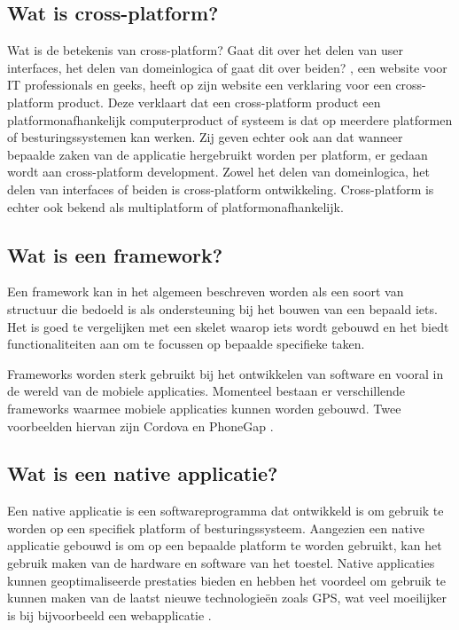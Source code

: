  \subsection{Wat is cross-platform?}
 Wat is de betekenis van cross-platform? Gaat dit over het delen van user interfaces, het delen van domeinlogica of gaat dit over beiden? \textcite{CrossExplain}, een website voor IT professionals en geeks, heeft op zijn website een verklaring voor een cross-platform product. Deze verklaart dat een cross-platform product een platformonafhankelijk computerproduct of systeem is dat op meerdere platformen of besturingssystemen kan werken. Zij geven echter ook aan dat wanneer bepaalde zaken van de applicatie hergebruikt worden per platform, er gedaan wordt aan cross-platform development. Zowel het delen van domeinlogica, het delen van interfaces of beiden is cross-platform ontwikkeling. Cross-platform is echter ook bekend als multiplatform of platformonafhankelijk.
 
\subsection{Wat is een framework?}
Een framework kan in het algemeen beschreven worden als een soort van structuur die bedoeld is als ondersteuning bij het bouwen van een bepaald iets. Het is goed te vergelijken met een skelet waarop iets wordt gebouwd en het biedt functionaliteiten aan om te focussen op bepaalde specifieke taken. 

Frameworks worden sterk gebruikt bij het ontwikkelen van software en vooral in de wereld van de mobiele applicaties. Momenteel bestaan er verschillende frameworks waarmee mobiele applicaties kunnen worden gebouwd. Twee voorbeelden hiervan zijn Cordova en PhoneGap \autocite{Framework}.

\subsection{Wat is een native applicatie?}
Een native applicatie is een softwareprogramma dat ontwikkeld is om gebruik te worden op een specifiek platform of besturingssysteem. Aangezien een native applicatie gebouwd is om op een bepaalde platform te worden gebruikt, kan het gebruik maken van de hardware en software van het toestel. Native applicaties kunnen geoptimaliseerde prestaties bieden en hebben het voordeel om gebruik te kunnen maken van de laatst nieuwe technologieën zoals GPS, wat veel moeilijker is bij bijvoorbeeld een webapplicatie \autocite{MeaningNativeApp}.

